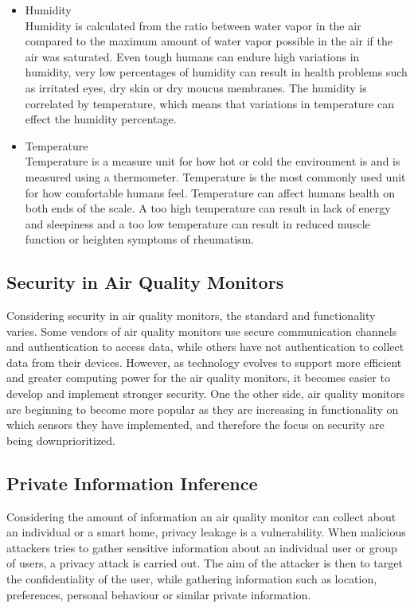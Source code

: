 \begin{itemize}
    \item Humidity\\
        Humidity is calculated from the ratio between water vapor in the air compared to the maximum amount of water vapor possible in the air if the air was saturated. \cite{RecommendedIAQ} Even tough humans can endure high variations in humidity, very low percentages of humidity can result in health problems such as irritated eyes, dry skin or dry moucus membranes. The humidity is correlated by temperature, which means that variations in temperature can effect the humidity percentage.
    \item Temperature\\
        Temperature is a measure unit for how hot or cold the environment is and is measured using a thermometer. Temperature is the most commonly used unit for how comfortable humans feel. Temperature can affect humans health on both ends of the scale. A too high temperature can result in lack of energy and sleepiness and a too low temperature can result in reduced muscle function or heighten symptoms of rheumatism. \cite{Temp}
\end{itemize}

\subsection*{Security in Air Quality Monitors}
Considering security in air quality monitors, the standard and functionality varies. \cite{AQMHowFarFunctionality} Some vendors of air quality monitors use secure communication channels and authentication to access data, while others have not authentication to collect data from their devices. However, as technology evolves to support more efficient and greater computing power for the air quality monitors, it becomes easier to develop and implement stronger security. One the other side, air quality monitors are beginning to become more popular as they are increasing in functionality on which sensors they have implemented, and therefore the focus on security are being downprioritized. \cite{SecurityAndDataIntInAQM} 

\subsection*{Private Information Inference}
Considering the amount of information an air quality monitor can collect about an individual or a smart home, privacy leakage is a vulnerability. \cite{SecPrivSmartCity} When malicious attackers tries to gather sensitive information about an individual user or group of users, a privacy attack is carried out. \cite{CyberEntitySecInIoT} The aim of the attacker is then to target the confidentiality of the user, while gathering information such as location, preferences, personal behaviour or similar private information.

